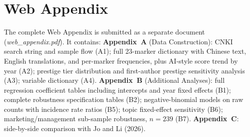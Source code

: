 \documentclass[12pt,a4paper]{article}
\begin{document}
\newpage
\section*{Web Appendix}

The complete Web Appendix is submitted as a separate document
(\textit{web\_appendix.pdf}).
It contains:
\textbf{Appendix~A} (Data Construction): CNKI search string and sample
flow (A1); full 23-marker dictionary with Chinese text, English
translations, and per-marker frequencies, plus AI-style score trend
by year (A2); prestige tier distribution and first-author prestige
sensitivity analysis (A3); variable dictionary (A4).
\textbf{Appendix~B} (Additional Analyses): full regression coefficient
tables including intercepts and year fixed effects (B1); complete
robustness specification tables (B2); negative-binomial models on raw
counts with incidence rate ratios (B5); topic fixed-effect sensitivity
(B6); marketing/management sub-sample robustness, $n=239$ (B7).
\textbf{Appendix~C}: side-by-side comparison with Jo and Li (2026).
\end{document}
